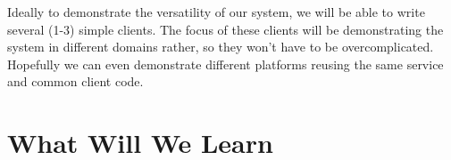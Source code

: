 \documentclass[12pt]{article}
\begin{document}
    Ideally to demonstrate the versatility of our system, we will be able to write several (1-3) simple clients.
    The focus of these clients will be demonstrating the system in different domains rather, so they won't have to be overcomplicated.
    Hopefully we can even demonstrate different platforms reusing the same service and common client code.

    \section{What Will We Learn}
\end{document}
